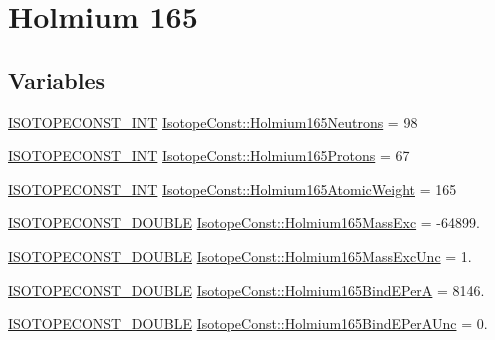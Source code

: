 \hypertarget{group___isotope_const-_holmium-_ho165}{}\section{Holmium 165}
\label{group___isotope_const-_holmium-_ho165}
\subsection*{Variables}
\begin{DoxyCompactItemize}
\item 
\mbox{\hyperlink{group___isotope_const-_macros_ga5f18360b3e99483a35c32d789e62621c}{I\+S\+O\+T\+O\+P\+E\+C\+O\+N\+S\+T\+\_\+\+I\+NT}} \mbox{\hyperlink{group___isotope_const-_holmium-_ho165_ga39d927f7c2e1cf4d8e5e2e9ac557d5d3}{Isotope\+Const\+::\+Holmium165\+Neutrons}} = 98
\item 
\mbox{\hyperlink{group___isotope_const-_macros_ga5f18360b3e99483a35c32d789e62621c}{I\+S\+O\+T\+O\+P\+E\+C\+O\+N\+S\+T\+\_\+\+I\+NT}} \mbox{\hyperlink{group___isotope_const-_holmium-_ho165_gabfadb2c4aa0fa4a3b2e9cf2de91b7108}{Isotope\+Const\+::\+Holmium165\+Protons}} = 67
\item 
\mbox{\hyperlink{group___isotope_const-_macros_ga5f18360b3e99483a35c32d789e62621c}{I\+S\+O\+T\+O\+P\+E\+C\+O\+N\+S\+T\+\_\+\+I\+NT}} \mbox{\hyperlink{group___isotope_const-_holmium-_ho165_ga98c6e334e273e85479f6468a78da13d0}{Isotope\+Const\+::\+Holmium165\+Atomic\+Weight}} = 165
\item 
\mbox{\hyperlink{group___isotope_const-_macros_ga8f45a7272ce02c0b4c65c44636ed719a}{I\+S\+O\+T\+O\+P\+E\+C\+O\+N\+S\+T\+\_\+\+D\+O\+U\+B\+LE}} \mbox{\hyperlink{group___isotope_const-_holmium-_ho165_ga9e82249a8d90250d1fcf5a2a93fabd60}{Isotope\+Const\+::\+Holmium165\+Mass\+Exc}} = -\/64899.
\item 
\mbox{\hyperlink{group___isotope_const-_macros_ga8f45a7272ce02c0b4c65c44636ed719a}{I\+S\+O\+T\+O\+P\+E\+C\+O\+N\+S\+T\+\_\+\+D\+O\+U\+B\+LE}} \mbox{\hyperlink{group___isotope_const-_holmium-_ho165_ga53c44ea294122d7c9014b17fe9ba6a4f}{Isotope\+Const\+::\+Holmium165\+Mass\+Exc\+Unc}} = 1.
\item 
\mbox{\hyperlink{group___isotope_const-_macros_ga8f45a7272ce02c0b4c65c44636ed719a}{I\+S\+O\+T\+O\+P\+E\+C\+O\+N\+S\+T\+\_\+\+D\+O\+U\+B\+LE}} \mbox{\hyperlink{group___isotope_const-_holmium-_ho165_gad01fb3934938ba5929592fb6c680faa7}{Isotope\+Const\+::\+Holmium165\+Bind\+E\+PerA}} = 8146.
\item 
\mbox{\hyperlink{group___isotope_const-_macros_ga8f45a7272ce02c0b4c65c44636ed719a}{I\+S\+O\+T\+O\+P\+E\+C\+O\+N\+S\+T\+\_\+\+D\+O\+U\+B\+LE}} \mbox{\hyperlink{group___isotope_const-_holmium-_ho165_gab81d74f96ce72d8c0e290875920bfd23}{Isotope\+Const\+::\+Holmium165\+Bind\+E\+Per\+A\+Unc}} = 0.

\end{DoxyCompactItemize}
